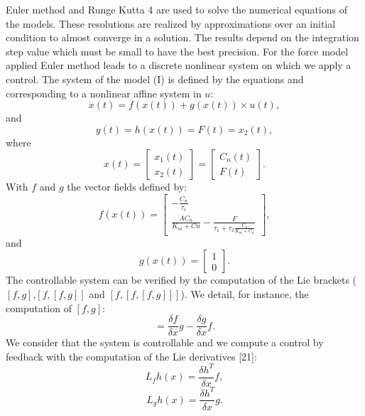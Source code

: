 \documentclass[10pt,twocolumn,letterpaper, 
]{article}
\begin{document}
Euler method and Runge Kutta 4 are used to solve the numerical equations of the models. These resolutions are realized by approximations over an initial condition to almost converge in a solution. The results depend on the integration step value which must be small to have the best precision. For the force model applied Euler method leads to a discrete nonlinear system on which we apply a control. The system of the model (I) is defined by the equations and corresponding to a nonlinear affine system in $u$:
\begin{equation}
\dot x(t)=f(x(t))+ g(x(t)) \times u(t),
\end{equation}
and
\begin{equation}
y(t)=h(x(t))=F(t)=x_2(t),
\end{equation}
where 
\begin{equation}
x(t)=
\begin{bmatrix}
x_1(t) \\
x_2(t)
\end{bmatrix}
=
\begin{bmatrix}
C_n(t) \\
F(t)
\end{bmatrix}.
\end{equation}
With $f$ and $g$ the vector fields defined by:
\begin{equation}
f(x(t))=
\begin{bmatrix}
-\frac{C_n}{\tau_c}\\
\frac{AC_n}{K_m+Cn} - \frac{F}{\tau_1+\tau_2 \frac{C_n}{K_m+C_n}}
\end{bmatrix},
\end{equation}
and
\begin{equation}
g(x(t))=
\begin{bmatrix}
1\\
0
\end{bmatrix}.
\end{equation}
The controllable system can be verified by the computation of the Lie brackets ($[f,g]$,$[f,[f,g]]$ and $[f,[f,[f,g]]]$). We detail, for instance, the computation of $[f,g]$:
\begin{equation}
[f,g]=\frac{\delta f}{\delta x} g -\frac{\delta g}{\delta x} f.
\end{equation}
We consider that the system is controllable and we compute a control by feedback with the computation of the Lie derivatives [21]:
\begin{equation}
L_fh(x)=\frac{\delta h^{T}}{\delta x}f,
\end{equation}
\begin{equation}
 L_gh(x)= \frac{\delta h^{T}}{\delta x}g.
\end{equation}
\end{document}
